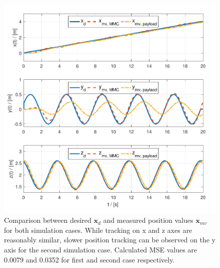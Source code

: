 \begin{figure}[h!]
	\centering
	\includegraphics[width=\columnwidth]{./pictures/traj_pos.pdf}
	\caption{Comparison between desired $\textbf{x}_d$ and measured position values $\textbf{x}_{mv}$ for both simulation cases. While tracking on x and z axes are reasonably similar, slower position tracking can be observed on the y axis for the second simulation case. Calculated MSE values are 0.0079 and 0.0352 for first and second case respectively.}
	\label{fig:traj_pos}
\end{figure}

